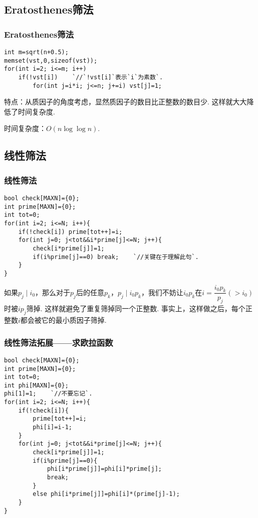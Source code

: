 \documentclass[xcolor=dvipsnames]{beamer}
\def\dou{，\!\!}
\begin{document}
    \subsection{Eratosthenes筛法}

    \begin{frame}
        \frametitle{Eratosthenes筛法}

        \begin{lstlisting}
int m=sqrt(n+0.5);
memset(vst,0,sizeof(vst));
for(int i=2; i<=m; i++)
    if(!vst[i])    `//`!vst[i]`表示`i`为素数`.
        for(int j=i*i; j<=n; j+=i) vst[j]=1;
        \end{lstlisting}\pause

        特点：\!\!从质因子的角度考虑\dou 显然质因子的数目比正整数的数目少. 这样就大大降低了时间复杂度.\pause

        时间复杂度：\!\!$O(n\log\log n)$.
    \end{frame}

    \subsection{线性筛法}

    \begin{frame}
        \frametitle{线性筛法}

        \begin{lstlisting}[basicstyle=\tiny\ttfamily,numberstyle=\tiny\ttfamily]
bool check[MAXN]={0};
int prime[MAXN]={0};
int tot=0;
for(int i=2; i<=N; i++){
    if(!check[i]) prime[tot++]=i;
    for(int j=0; j<tot&&i*prime[j]<=N; j++){
        check[i*prime[j]]=1;
        if(i%prime[j]==0) break;    `//关键在于理解此句`.
    }
}
        \end{lstlisting}\pause

        {\small 如果$p_j\mid i_0$\dou 那么对于$p_j$后的任意$p_k$\dou $p_j\mid i_0p_k$\dou 我们不妨让$i_0p_k$在$i=\dfrac{i_0p_k}{p_j}(>i_0)$时被$ip_j$筛掉. 这样就避免了重复筛掉同一个正整数. 事实上\dou 这样做之后\dou 每个正整数$i$都会被它的最小质因子筛掉.}
    \end{frame}

    \begin{frame}
        \frametitle{线性筛法拓展——求欧拉函数}

        \begin{lstlisting}
bool check[MAXN]={0};
int prime[MAXN]={0};
int tot=0;
int phi[MAXN]={0};
phi[1]=1;    `//不要忘记`.
for(int i=2; i<=N; i++){
    if(!check[i]){
        prime[tot++]=i;
        phi[i]=i-1;
    }        
    for(int j=0; j<tot&&i*prime[j]<=N; j++){
        check[i*prime[j]]=1;
        if(i%prime[j]==0){
            phi[i*prime[j]]=phi[i]*prime[j];
            break;
        }
        else phi[i*prime[j]]=phi[i]*(prime[j]-1);
    }
}
        \end{lstlisting}
    \end{frame}
\end{document}

